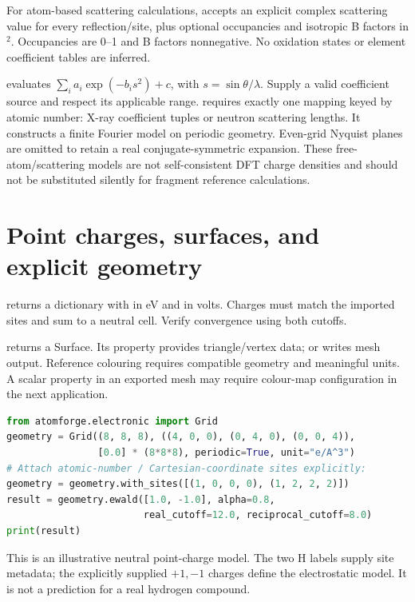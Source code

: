 For atom-based scattering calculations,  accepts an explicit complex scattering value for every reflection/site, plus optional occupancies and isotropic B factors in \angstrom$^2$. Occupancies are 0--1 and B factors nonnegative. No oxidation states or element coefficient tables are inferred.

 evaluates $\sum_i a_i\exp(-b_is^2)+c$, with $s=\sin\theta/\lambda$. Supply a valid coefficient source and respect its applicable range.  requires exactly one mapping keyed by atomic number: X-ray coefficient tuples or neutron scattering lengths. It constructs a finite Fourier model on periodic geometry. Even-grid Nyquist planes are omitted to retain a real conjugate-symmetric expansion. These free-atom/scattering models are not self-consistent DFT charge densities and should not be substituted silently for fragment reference calculations.

\section{Point charges, surfaces, and explicit geometry}
 returns a dictionary with  in eV and  in volts. Charges must match the imported sites and sum to a neutral cell. Verify convergence using both cutoffs.

 returns a Surface. Its  property provides triangle/vertex data;  or  writes mesh output. Reference colouring requires compatible geometry and meaningful units. A scalar property in an exported mesh may require colour-map configuration in the next application.

\begin{lstlisting}[language=Python]
from atomforge.electronic import Grid
geometry = Grid((8, 8, 8), ((4, 0, 0), (0, 4, 0), (0, 0, 4)),
                [0.0] * (8*8*8), periodic=True, unit="e/A^3")
# Attach atomic-number / Cartesian-coordinate sites explicitly:
geometry = geometry.with_sites([(1, 0, 0, 0), (1, 2, 2, 2)])
result = geometry.ewald([1.0, -1.0], alpha=0.8,
                        real_cutoff=12.0, reciprocal_cutoff=8.0)
print(result)
\end{lstlisting}
This is an illustrative neutral point-charge model. The two H labels supply site metadata; the explicitly supplied $+1,-1$ charges define the electrostatic model. It is not a prediction for a real hydrogen compound.

